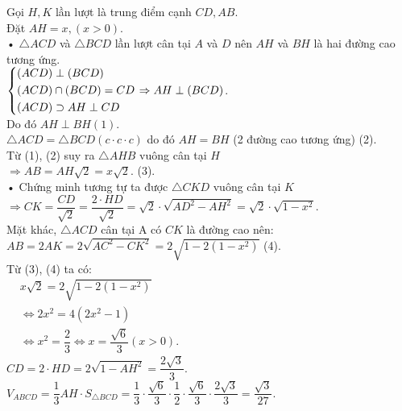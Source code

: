 \begin{ex}
{\begin{center}
		\end{center}
		Gọi $H,K$ lần lượt là trung điểm cạnh $CD, AB$.\\
		Đặt $AH=x,(x>0)$.\\
		• $\triangle ACD$ và $\triangle BCD$ lần lượt cân tại $A$ và $D$ nên $AH$ và $BH$ là hai đường cao tương ứng.\\
		$\left\{\begin{aligned}&(ACD)\perp(BCD)\\&(ACD)\cap(BCD)=CD\\&(ACD)\supset AH\perp CD\end{aligned}\right.\Rightarrow AH\perp(BCD)$.\\
		Do đó $AH\perp BH(1)$.\\
		$\triangle ACD=\triangle BCD(c\cdot c\cdot c)$ do đó $AH=BH$ (2 đường cao tương ứng) (2).\\
		Từ (1), (2) suy ra $\triangle AHB$ vuông cân tại $H$ \\
		$ \Rightarrow AB=AH\sqrt{2}=x\sqrt{2} $. (3).\\
		• Chứng minh tương tự ta được $\triangle CKD$ vuông cân tại $K$ \\
		$ \Rightarrow CK=\dfrac{CD}{\sqrt{2}}=\dfrac{2\cdot HD}{\sqrt{2}}=\sqrt{2}\cdot\sqrt{AD^2-AH^2}=\sqrt{2}\cdot\sqrt{1-x^2} $.\\
		Mặt khác, $\triangle ACD$ cân tại A có $CK$ là đường cao nên:\\
		$AB=2AK=2\sqrt{AC^2-CK^2}=2\sqrt{1-2\left(1-x^2\right)}$ (4).\\
		Từ (3), (4) ta có:\\
		$\begin{aligned}&x\sqrt{2}=2\sqrt{1-2\left(1-x^2\right)}\\&\Leftrightarrow 2x^2=4\left(2x^2-1\right)\\&\Leftrightarrow x^2=\dfrac{2}{3}\Leftrightarrow x=\dfrac{\sqrt{6}}{3}(x>0).\end{aligned}$\\
		$CD=2\cdot HD=2\sqrt{1-AH^2}=\dfrac{2\sqrt{3}}{3}$.\\
		$V_{ABCD}=\dfrac{1}{3}AH\cdot S_{\triangle BCD}=\dfrac{1}{3}\cdot\dfrac{\sqrt{6}}{3}\cdot\dfrac{1}{2}\cdot\dfrac{\sqrt{6}}{3}\cdot\dfrac{2\sqrt{3}}{3}=\dfrac{\sqrt{3}}{27}$.}
\end{ex}
